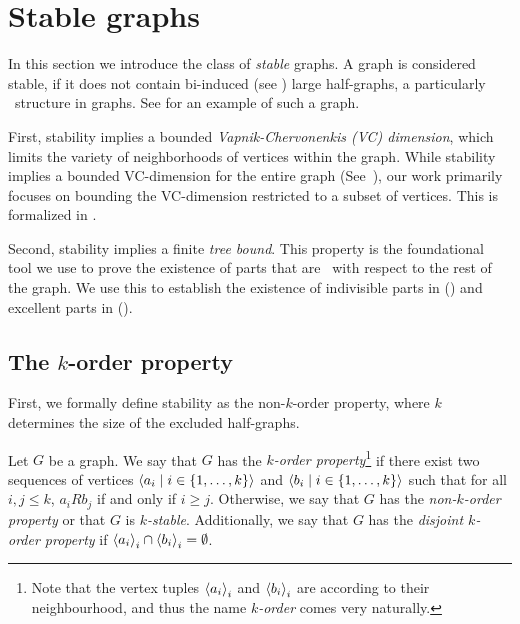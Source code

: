 \section{Stable graphs} \label{sec:section_3}

    In this section we introduce the class of \emph{stable} graphs.
    A graph is considered stable, if it does not contain bi-induced (see )
    large half-graphs, a particularly \irregular~structure in graphs.
    See  for an example of such a graph.

    

    First, stability implies a bounded \emph{Vapnik-Chervonenkis (VC) dimension}, which limits the variety of
    neighborhoods of vertices within the graph.
    While stability implies a bounded VC-dimension for the entire graph
    (See~\cite{regularity_partitions_and_the_topology_of_graphons}), our work primarily focuses on bounding
    the VC-dimension restricted to a subset of vertices.
    This is formalized in .

    Second, stability implies a finite \emph{tree bound}.
    This property is the foundational tool we use to prove the existence of parts that are \regular~with
    respect to the rest of the graph.
    We use this to establish the existence of indivisible parts in 
    () and
    excellent parts in  ().

    \subsection{The $k$-order property} \label{subsec:subsection_3.1}

        First, we formally define stability as the non-$k$-order property, where $k$ determines the size of the
        excluded half-graphs.

        \begin{definition} \label{def:k_order_property}
            Let $G$ be a graph.
            We say that $G$ has the \emph{$k$-order property}\footnote{
                Note that the vertex tuples $\left< a_i \right>_i$ and $\left< b_i \right>_i$ are  according to their neighbourhood,
                and thus the name \emph{$k$-order} comes very naturally.
            } if there exist two sequences of vertices
            $\left< a_i \mid i \in \{ 1, \dots, k \} \right>$ and $\left< b_i \mid i \in \{ 1, \dots, k \} \right>$ such that
            for all $i,j \leq k$, $a_i R b_j$ if and only if $i \geq j$.
            Otherwise, we say that $G$ has the \emph{non-$k$-order property} or that $G$ is \emph{$k$-stable}.
            Additionally, we say that $G$ has the \emph{disjoint $k$-order property} if
            $\left< a_i \right>_i \cap \left< b_i \right>_i = \emptyset$.
        \end{definition}


